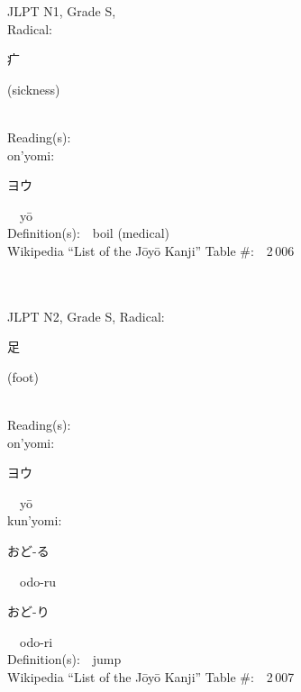 \begin{multicols}{2}
{JLPT N1, Grade S, \\Radical:\ \ {\begin{CJK}{UTF8}{min} 疒 \end{CJK}} (sickness) } \\
Reading(s):\ \ \\
{\hspace*{1em}}on'yomi:\ \ \\
{\hspace*{2em}}{\begin{CJK}{UTF8}{min} ヨウ \end{CJK}}\ \ y\=o\ \ \\
Definition(s):\ \ boil (medical) \\
Wikipedia ``List of the J\=oy\=o Kanji'' Table \#:\ \ 2\,006 \\
\ \ \\
{\fontsize{34pt}{40pt}  }\ \ \\  %
{JLPT N2, Grade S, Radical:\ \ {\begin{CJK}{UTF8}{min} 足 \end{CJK}} (foot) } \\
Reading(s):\ \ \\
{\hspace*{1em}}on'yomi:\ \ \\
{\hspace*{2em}}{\begin{CJK}{UTF8}{min} ヨウ \end{CJK}}\ \ y\=o\ \ \\
{\hspace*{1em}}kun'yomi:\ \ \\
{\hspace*{2em}}{\begin{CJK}{UTF8}{min} おど-る \end{CJK}}\ \ odo-ru\ \ \\
{\hspace*{2em}}{\begin{CJK}{UTF8}{min} おど-り \end{CJK}}\ \ odo-ri\ \ \\
Definition(s):\ \ jump \\
Wikipedia ``List of the J\=oy\=o Kanji'' Table \#:\ \ 2\,007 \\
\ \ \\
{\fontsize{34pt}{40pt}  }\ \ \\

\end{multicols}
